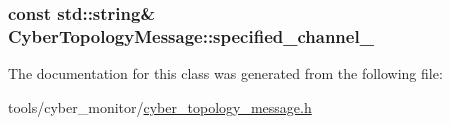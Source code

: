 \hypertarget{classCyberTopologyMessage_a5896a556d8bfbe583d112690f025a063}{
\subsubsection[{specified\-\_\-channel\-\_\-}]{\setlength{\rightskip}{0pt plus 5cm}const std\-::string\& Cyber\-Topology\-Message\-::specified\-\_\-channel\-\_\-\hspace{0.3cm}{\ttfamily [private]}}}\label{classCyberTopologyMessage_a5896a556d8bfbe583d112690f025a063}


The documentation for this class was generated from the following file\-:\begin{DoxyCompactItemize}
\item 
tools/cyber\-\_\-monitor/\hyperlink{cyber__topology__message_8h}{cyber\-\_\-topology\-\_\-message.\-h}\end{DoxyCompactItemize}
